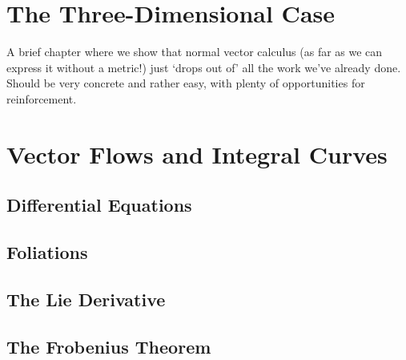 \documentclass[oneside,english]{amsbook}
\numberwithin{section}{chapter}
\theoremstyle{plain}
\theoremstyle{definition}
\begin{document}
	\chapter{The Three-Dimensional Case}
	
		A brief chapter where we show that normal vector calculus (as far as we can express it without a metric!) just `drops out of' all the work we've already done. Should be very concrete and rather easy, with plenty of opportunities for reinforcement.

	\chapter{Vector Flows and Integral Curves}
	
		\section{Differential Equations}

		\section{Foliations}

		\section{The Lie Derivative}
	
		\section{The Frobenius Theorem}
\end{document}
